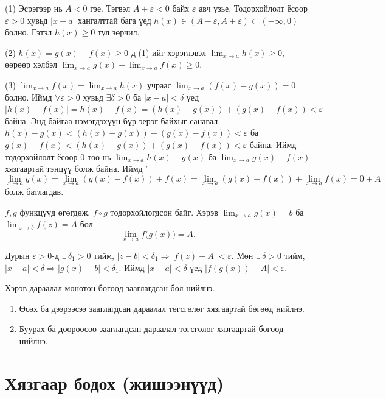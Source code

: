 \begin{prof}
(1) Эсрэгээр нь $A<0$ гэе. Тэгвэл $A+\varepsilon<0$ байх $\varepsilon$ авч үзье. Тодорхойлолт ёсоор $\varepsilon>0$ хувьд $|x-a|$ хангалттай бага үед $h(x)\in (A-\varepsilon,A+\varepsilon)\subset (-\infty,0)$ болно. Гэтэл $h(x)\ge 0$ тул зөрчил.

(2) $h(x)=g(x)-f(x)\ge 0$-д (1)-ийг хэрэглэвэл $\lim_{x\to a} h(x)\ge 0$, өөрөөр хэлбэл $\lim_{x\to a} g(x)-\lim_{x\to a} f(x)\ge 0$.

(3) $\lim_{x\to a} f(x)=\lim_{x\to a} h(x)$ учраас $\lim_{x\to a} (f(x)-g(x))=0$ болно. Иймд $\forall \varepsilon>0$ хувьд $\exists\delta >0$ ба  $|x-a|<\delta$ үед $|h(x)-f(x)|=h(x)-f(x)=(h(x)-g(x))+(g(x)-f(x))<\varepsilon$ байна. Энд байгаа нэмэгдэхүүн бүр эерэг байхыг санавал $h(x)-g(x)< (h(x)-g(x))+(g(x)-f(x))<\varepsilon$ ба $g(x)-f(x)< (h(x)-g(x))+(g(x)-f(x))<\varepsilon$ байна. Иймд тодорхойлолт ёсоор $0$ тоо нь  $\lim_{x\to a} h(x)-g(x)$ ба $\lim_{x\to a} g(x)-f(x)$ хязгаартай тэнцүү болж байна. Иймд '
$$\lim_{x\to a} g(x)=\lim_{x\to a} (g(x)-f(x))+f(x)=\lim_{x\to a} (g(x)-f(x))+\lim_{x\to a} f(x)=0+A$$ болж батлагдав.
\end{prof}
\begin{theorem}\label{complim}
$f,g$ функцүүд өгөгдөж, $f\circ g$ тодорхойлогдсон байг. Хэрэв $\displaystyle\lim_{x\to a} g(x)=b$ ба $\displaystyle\lim_{z\to b} f(z)=A$ бол
\[
\lim_{x\to a} f\bigl(g(x)\bigr)=A.
\]
\end{theorem}

\begin{prof}
Дурын $\varepsilon>0$-д $\exists\,\delta_1>0$ тийм, $|z-b|<\delta_1\Rightarrow |f(z)-A|<\varepsilon$. Мөн $\exists\,\delta>0$ тийм, $|x-a|<\delta\Rightarrow |g(x)-b|<\delta_1$. Иймд $|x-a|<\delta$ үед $|f(g(x))-A|<\varepsilon$.
\end{prof}
\begin{theorem}\label{monton seq lim}
Хэрэв дараалал монотон бөгөөд зааглагдсан бол нийлнэ.  
\begin{enumerate}
\item Өсөх ба дээрээсээ зааглагдсан дараалал төгсгөлөг хязгаартай бөгөөд нийлнэ.  
\item Буурах ба доороосоо зааглагдсан дараалал төгсгөлөг хязгаартай бөгөөд нийлнэ.
\end{enumerate}
\end{theorem}
\section{Хязгаар бодох (жишээнүүд)}

